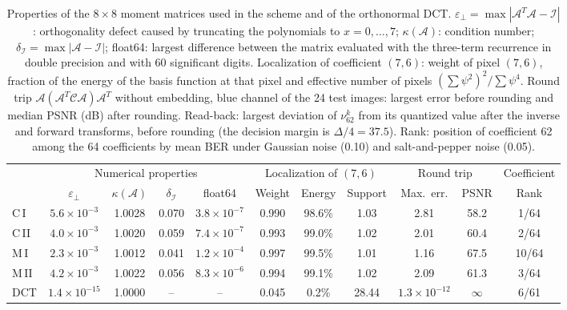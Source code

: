 \begin{table}[t]
\centering
\caption{Properties of the $8\times8$ moment matrices used in the scheme and of the orthonormal DCT. $\varepsilon_{\perp}=\max|\mathcal{A}^{T}\mathcal{A}-\mathcal{I}|$: orthogonality defect caused by truncating the polynomials to $x=0,\dots,7$; $\kappa(\mathcal{A})$: condition number; $\delta_{\mathcal{I}}=\max|\mathcal{A}-\mathcal{I}|$; float64: largest difference between the matrix evaluated with the three-term recurrence in double precision and with 60 significant digits. Localization of coefficient $(7,6)$: weight of pixel $(7,6)$, fraction of the energy of the basis function at that pixel and effective number of pixels $(\sum\psi^2)^2/\sum\psi^4$. Round trip $\mathcal{A}(\mathcal{A}^{T}\mathcal{C}\mathcal{A})\mathcal{A}^{T}$ without embedding, blue channel of the 24 test images: largest error before rounding and median PSNR (dB) after rounding. Read-back: largest deviation of $\nu^{k}_{62}$ from its quantized value after the inverse and forward transforms, before rounding (the decision margin is $\Delta/4=37.5$). Rank: position of coefficient 62 among the 64 coefficients by mean BER under Gaussian noise (0.10) and salt-and-pepper noise (0.05).}
\label{tab:moment_properties}
\footnotesize
\setlength{\tabcolsep}{2pt}
\begin{tabular}{lcccccccccc}
\toprule
 & \multicolumn{4}{c}{Numerical properties} & \multicolumn{3}{c}{Localization of $(7,6)$} & \multicolumn{2}{c}{Round trip} & Coefficient \\
\cmidrule(lr){2-5}\cmidrule(lr){6-8}\cmidrule(lr){9-10}\cmidrule(lr){11-11}
 & $\varepsilon_{\perp}$ & $\kappa(\mathcal{A})$ & $\delta_{\mathcal{I}}$ & float64 & Weight & Energy & Support & Max.\ err. & PSNR & Rank \\
\midrule
C\,I & $5.6\times10^{-3}$ & 1.0028 & 0.070 & $3.8\times10^{-7}$ & 0.990 & 98.6\% & 1.03 & 2.81 & 58.2 & 1/64 \\
C\,II & $4.0\times10^{-3}$ & 1.0020 & 0.059 & $7.4\times10^{-7}$ & 0.993 & 99.0\% & 1.02 & 2.01 & 60.4 & 2/64 \\
M\,I & $2.3\times10^{-3}$ & 1.0012 & 0.041 & $1.2\times10^{-4}$ & 0.997 & 99.5\% & 1.01 & 1.16 & 67.5 & 10/64 \\
M\,II & $4.2\times10^{-3}$ & 1.0022 & 0.056 & $8.3\times10^{-6}$ & 0.994 & 99.1\% & 1.02 & 2.09 & 61.3 & 3/64 \\
DCT & $1.4\times10^{-15}$ & 1.0000 & -- & -- & 0.045 & 0.2\% & 28.44 & $1.3\times10^{-12}$ & $\infty$ & 6/61 \\
\bottomrule
\end{tabular}
\end{table}
